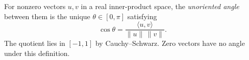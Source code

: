 
For nonzero vectors $u,v$ in a real inner-product space, the \emph{unoriented angle} between them is the unique $\theta\in[0,\pi]$ satisfying
\[
\cos\theta=\frac{\langle u,v\rangle}{\|u\|\,\|v\|}.
\]
The quotient lies in $[-1,1]$ by Cauchy--Schwarz. Zero vectors have no angle under this definition.
